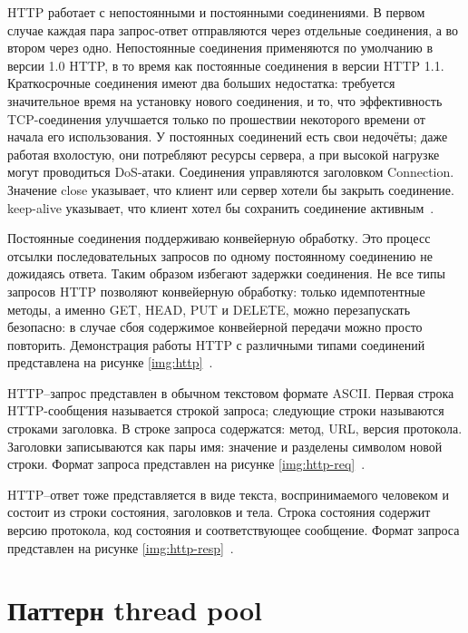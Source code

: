 HTTP работает с непостоянными и постоянными соединениями. В первом случае каждая пара запрос-ответ отправляются через отдельные соединения, а во втором через одно. Непостоянные соединения применяются по умолчанию в версии 1.0 HTTP, в то время как постоянные соединения в версии HTTP 1.1. Краткосрочные соединения имеют два больших недостатка: требуется значительное время на установку нового соединения, и то, что эффективность TCP-соединения улучшается только по прошествии некоторого времени от начала его использования. У постоянных соединений есть свои недочёты; даже работая вхолостую, они потребляют ресурсы сервера, а при высокой нагрузке могут проводиться DoS-атаки. Соединения управляются заголовком Connection. Значение close указывает, что клиент или сервер хотели бы закрыть соединение. keep-alive указывает, что клиент хотел бы сохранить соединение активным~\cite{conn}.

Постоянные соединения поддерживаю конвейерную обработку. Это процесс отсылки последовательных запросов по одному постоянному соединению не дожидаясь ответа. Таким образом избегают задержки соединения. Не все типы запросов HTTP позволяют конвейерную обработку: только идемпотентные методы, а именно GET, HEAD, PUT и DELETE, можно перезапускать безопасно: в случае сбоя содержимое конвейерной передачи можно просто повторить. Демонстрация работы HTTP с различными типами соединений представлена на рисунке \ref{img:http}~\cite{conn}.

\FloatBarrier

HTTP--запрос представлен в обычном текстовом формате ASCII. Первая строка HTTP-сообщения называется строкой запроса; следующие строки называются строками заголовка. В строке запроса содержатся: метод, URL, версия протокола. Заголовки записываются как пары имя: значение и разделены символом новой строки. Формат запроса представлен на рисунке \ref{img:http-req}~\cite{seti}.

\FloatBarrier

HTTP--ответ тоже представляется в виде текста, воспринимаемого человеком и состоит из строки состояния, заголовков и тела. Строка состояния содержит версию протокола, код состояния и соответствующее сообщение. Формат запроса представлен на рисунке \ref{img:http-resp}~\cite{seti}.

\FloatBarrier

\section{Паттерн thread pool}

